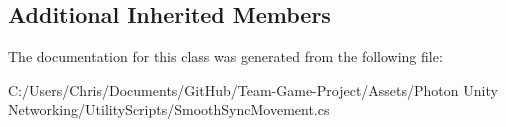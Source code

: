 \subsection*{Additional Inherited Members}


The documentation for this class was generated from the following file\+:\begin{DoxyCompactItemize}
\item 
C\+:/\+Users/\+Chris/\+Documents/\+Git\+Hub/\+Team-\/\+Game-\/\+Project/\+Assets/\+Photon Unity Networking/\+Utility\+Scripts/Smooth\+Sync\+Movement.\+cs\end{DoxyCompactItemize}

